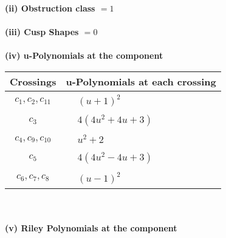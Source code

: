 \documentclass[1p]{elsarticle_modified}
\theoremstyle{definition}
\begin{document}
\flushleft \textbf{(ii) Obstruction class $= 1$}\\~\\
\flushleft \textbf{(iii) Cusp Shapes $= 0$}\\~\\
\newpage\renewcommand{\arraystretch}{1}
\flushleft \textbf{(iv) u-Polynomials at the component}\newline \\
\begin{tabular}{m{50pt}|m{274pt}}
Crossings & \hspace{64pt}u-Polynomials at each crossing \\
\hline $$\begin{aligned}c_{1},c_{2},c_{11}\end{aligned}$$&$\begin{aligned}
&(u+1)^2
\end{aligned}$\\
\hline $$\begin{aligned}c_{3}\end{aligned}$$&$\begin{aligned}
&4(4 u^2+4 u+3)
\end{aligned}$\\
\hline $$\begin{aligned}c_{4},c_{9},c_{10}\end{aligned}$$&$\begin{aligned}
&u^2+2
\end{aligned}$\\
\hline $$\begin{aligned}c_{5}\end{aligned}$$&$\begin{aligned}
&4(4 u^2-4 u+3)
\end{aligned}$\\
\hline $$\begin{aligned}c_{6},c_{7},c_{8}\end{aligned}$$&$\begin{aligned}
&(u-1)^2
\end{aligned}$\\
\hline
\end{tabular}\\~\\
\newpage\renewcommand{\arraystretch}{1}
\flushleft \textbf{(v) Riley Polynomials at the component}\newline \\
\end{document}
